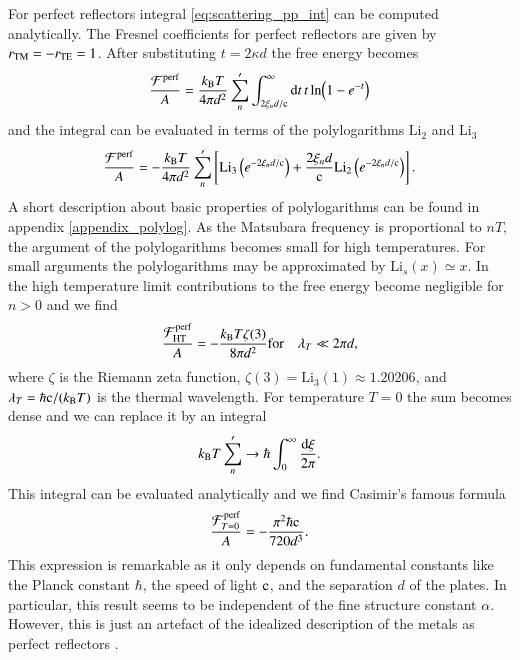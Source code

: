 For perfect reflectors integral \eqref{eq:scattering_pp_int} can be
computed analytically. The Fresnel coefficients for perfect reflectors are
given by $r_{\mathrm{TM}}=-r_{\mathrm{TE}}=1$. After substituting $t=2\kappa d$ the free energy
becomes
\begin{equation}
\frac{\mathcal{F}^\text{perf}}{A} = \frac{k_\text{B} T}{4\pi d^2} \sum_n^\prime \int_{2\xi_n d/\mathrm{c}}^\infty \mathrm{d}t \, t \, \text{ln}{\left(1-e^{-t}\right)}
\end{equation}
and the integral can be evaluated in terms of the polylogarithms $\text{Li}_2$ and $\text{Li}_3$
\begin{equation}
\label{eq:scattering_pp_F_perfect}
\frac{\mathcal{F}^\text{perf}}{A} = -\frac{k_\text{B} T}{4\pi d^2} \sum_n^\prime \left[ \text{Li}_3\left(e^{-2\xi_n d/\mathrm{c}}\right) + \frac{2\xi_n d}{\mathrm{c}} \text{Li}_2\left(e^{-2\xi_n d/\mathrm{c}}\right)\right].
\end{equation}
A short description about basic properties of polylogarithms can be found in
appendix \ref{appendix_polylog}. As the Matsubara frequency is proportional to
$nT$, the argument of the polylogarithms becomes small for high temperatures.
For small arguments the polylogarithms may be approximated by $\text{Li}_s(x)
\simeq x$. In the high temperature limit contributions to the free energy
become negligible for $n>0$ and we find
\begin{equation}
\label{eq:scattering_pp_F_perfect_hiT}
\frac{\mathcal{F}^\text{perf}_\text{HT}}{A} = -\frac{k_\text{B} T \zeta(3)}{8\pi d^2} \\ \text{for} \quad \lambda_T \ll 2\pi d,
\end{equation}
where $\zeta$ is the Riemann zeta function,
$\zeta(3)=\text{Li}_3(1)\approx1.20206$, and $\lambda_T = \hbar\mathrm{c}/(k_\text{B} T)$ is
the thermal wavelength. For temperature $T=0$ the sum becomes dense and we can
replace it by an integral
\begin{equation}
k_\text{B} T \sum_n^\prime \to \hbar \int_0^\infty \frac{\mathrm{d}\xi}{2\pi}.
\end{equation}
This integral can be evaluated analytically and we find Casimir's famous
formula
\begin{equation}
\label{eq:scattering_pp_F_perfect_T0}
\frac{\mathcal{F}^\text{perf}_{T=0}}{A} = - \frac{\pi^2 \hbar \mathrm{c}}{720 d^3}.
\end{equation}
This expression is remarkable as it only depends on fundamental constants like
the Planck constant $\hbar$, the speed of light $\mathrm{c}$, and the separation $d$ of
the plates. In particular, this result seems to be independent of the fine
structure constant $\alpha$. However, this is just an artefact of the idealized
description of the metals as perfect reflectors \cite{jaffe2005casimir}.

